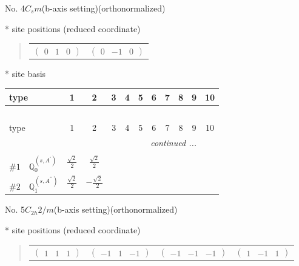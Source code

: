 \documentclass[fleqn,9pt,landscape]{jsarticle}
\begin{document}
\newpage
\begin{center}
\LARGE
No. 4\quad$C_{s}$\quad$m$\quad(b-axis setting)\quad[ monoclinic ] (orthonormalized)
\end{center}
\vspace{5mm}
* site positions (reduced coordinate)
\begin{quote}
\begin{tabular}{cc}
$ \begin{pmatrix} 0 & 1 & 0 \end{pmatrix} $ & $ \begin{pmatrix} 0 & -1 & 0 \end{pmatrix} $
\end{tabular}
\end{quote}
* site basis
\begin{center}
\renewcommand{\arraystretch}{1.3}
\begin{longtable}{lcccccccccc}
 \hline \hline
type & 1 & 2 & 3 & 4 & 5 & 6 & 7 & 8 & 9 & 10 \\ \hline \endfirsthead

\multicolumn{10}{l}{\tablename\ \thetable{}} \\
 \hline \hline
type & 1 & 2 & 3 & 4 & 5 & 6 & 7 & 8 & 9 & 10 \\ \hline \endhead

 \hline \hline
\multicolumn{10}{r}{\footnotesize\it continued ...} \\ \endfoot

 \hline \hline
\multicolumn{10}{r}{} \\ \endlastfoot

$ \#1\quad \mathbb{Q}_{0}^{(s,A^{\prime})} $ & $ \frac{\sqrt{2}}{2} $ & $ \frac{\sqrt{2}}{2} $ \\ \hline
$ \#2\quad \mathbb{Q}_{1}^{(s,A^{\prime\prime})} $ & $ \frac{\sqrt{2}}{2} $ & $ - \frac{\sqrt{2}}{2} $ \\
\end{longtable}
\end{center}
\newpage
\begin{center}
\LARGE
No. 5\quad$C_{2h}$\quad$2/m$\quad(b-axis setting)\quad[ monoclinic ] (orthonormalized)
\end{center}
\vspace{5mm}
* site positions (reduced coordinate)
\begin{quote}
\begin{tabular}{cccc}
$ \begin{pmatrix} 1 & 1 & 1 \end{pmatrix} $ & $ \begin{pmatrix} -1 & 1 & -1 \end{pmatrix} $ & $ \begin{pmatrix} -1 & -1 & -1 \end{pmatrix} $ & $ \begin{pmatrix} 1 & -1 & 1 \end{pmatrix} $
\end{tabular}
\end{quote}
\end{document}
